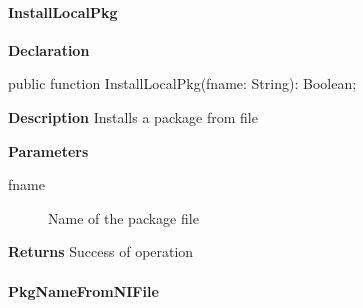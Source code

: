 \documentclass{report}
\newif\ifpdf
\begin{document}
\paragraph*{InstallLocalPkg}\hspace*{\fill}

\label{packagekit.TPackageKit-InstallLocalPkg}
\begin{list}{}{
\setlength{\itemindent}{0cm}
\setlength{\listparindent}{0cm}
\setlength{\leftmargin}{\evensidemargin}
\addtolength{\leftmargin}{\tmplength}
\settowidth{\labelsep}{X}
\addtolength{\leftmargin}{\labelsep}
\setlength{\labelwidth}{\tmplength}
}
\item[\textbf{Declaration}\hfill]
\ifpdf
\begin{flushleft}
\fi
\begin{ttfamily}
public function InstallLocalPkg(fname: String): Boolean;\end{ttfamily}

\ifpdf
\end{flushleft}
\fi

\par
\item[\textbf{Description}]
Installs a package from file  \par
\item[\textbf{Parameters}]
\begin{description}
\item[fname] Name of the package file
\end{description}
\item[\textbf{Returns}]Success of operation


\end{list}
\paragraph*{PkgNameFromNIFile}\hspace*{\fill}
\end{document}
